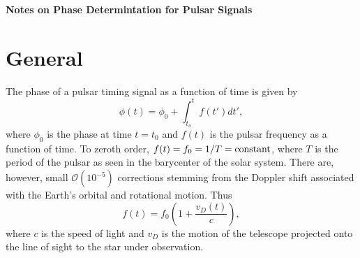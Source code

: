 \documentclass[12pt]{article}
\begin{document}
%
\bigskip
\bigskip
\bigskip
\begin{center}
{\Large \bf Notes on Phase Determintation for Pulsar Signals}
\end{center}

\section{General}
The phase of a pulsar timing signal as a function of time is given by
\begin{equation}
\phi(t) = \phi_0 + \int_{t_o}^{t} f(t') dt' ,
\end{equation}
where $\phi_0$ is the phase at time $t=t_0$ and $f(t)$ is the pulsar frequency as a function of time.   To zeroth order, $f(t) = f_0 = 1/T = {\rm constant}$, where $T$ is the period of the pulsar as seen in the barycenter of the solar system.   There are, however, small $\mathcal{O}(10^{-5})$ corrections stemming  from the Doppler shift associated with the Earth's orbital and rotational motion.   Thus
\begin{equation}
f(t) = f_0 \left(1 + \frac{v_D(t)}{c}\right),
\end{equation}
where $c$ is the speed of light and $v_D$ is the motion of the telescope projected onto the line of sight to the star under observation.   
 
\end{document}
